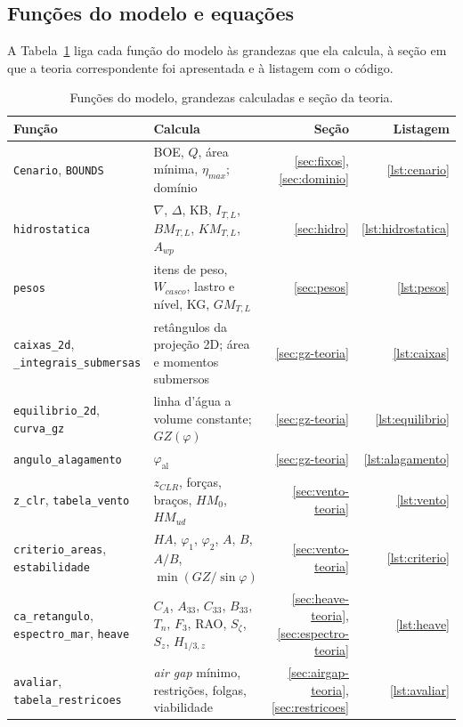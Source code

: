 \documentclass[11pt,a4paper]{article}
\newcommand{\phial}{\varphi_{\mathrm{al}}}
\newcommand{\Hz}{H_{1/3,z}}
\newcommand{\Wc}{W_{casco}}
\begin{document}
\subsection{Funções do modelo e equações}

A Tabela~\ref{tab:funcoes} liga cada função do modelo às grandezas que ela calcula, à seção em que
a teoria correspondente foi apresentada e à listagem com o código.

\begin{table}[!htb]
\centering
\caption{Funções do modelo, grandezas calculadas e seção da teoria.}\label{tab:funcoes}
\small
\begin{tabular}{>{\raggedright\arraybackslash}p{4.4cm}>{\raggedright\arraybackslash}p{6.9cm}rr}
\toprule
Função & Calcula & Seção & Listagem \\
\midrule
\texttt{Cenario}, \texttt{BOUNDS} & BOE, $Q$, área mínima, $\eta_{max}$; domínio &
\ref{sec:fixos}, \ref{sec:dominio} & \ref{lst:cenario} \\
\texttt{hidrostatica} & $\nabla$, $\Delta$, KB, $I_{T,L}$, $BM_{T,L}$, $KM_{T,L}$, $A_{wp}$ &
\ref{sec:hidro} & \ref{lst:hidrostatica} \\
\texttt{pesos} & itens de peso, $\Wc$, lastro e nível, KG, $GM_{T,L}$ & \ref{sec:pesos} &
\ref{lst:pesos} \\
\texttt{caixas\_2d}, \texttt{\_integrais\_submersas} & retângulos da projeção 2D; área e momentos
submersos & \ref{sec:gz-teoria} & \ref{lst:caixas} \\
\texttt{equilibrio\_2d}, \texttt{curva\_gz} & linha d'água a volume constante; $GZ(\varphi)$ &
\ref{sec:gz-teoria} & \ref{lst:equilibrio} \\
\texttt{angulo\_alagamento} & $\phial$ & \ref{sec:gz-teoria} & \ref{lst:alagamento} \\
\texttt{z\_clr}, \texttt{tabela\_vento} & $z_{CLR}$, forças, braços, $HM_0$, $HM_{ud}$ &
\ref{sec:vento-teoria} & \ref{lst:vento} \\
\texttt{criterio\_areas}, \texttt{estabilidade} & $HA$, $\varphi_1$, $\varphi_2$, $A$, $B$, $A/B$,
$\min(GZ/\sin\varphi)$ & \ref{sec:vento-teoria} & \ref{lst:criterio} \\
\texttt{ca\_retangulo}, \texttt{espectro\_mar}, \texttt{heave} & $C_A$, $A_{33}$, $C_{33}$, $B_{33}$,
$T_n$, $F_3$, RAO, $S_\zeta$, $S_z$, $\Hz$ & \ref{sec:heave-teoria}, \ref{sec:espectro-teoria} &
\ref{lst:heave} \\
\texttt{avaliar}, \texttt{tabela\_restricoes} & \emph{air gap} mínimo, restrições, folgas,
viabilidade & \ref{sec:airgap-teoria}, \ref{sec:restricoes} & \ref{lst:avaliar} \\

\end{tabular}
\end{table}
\end{document}
